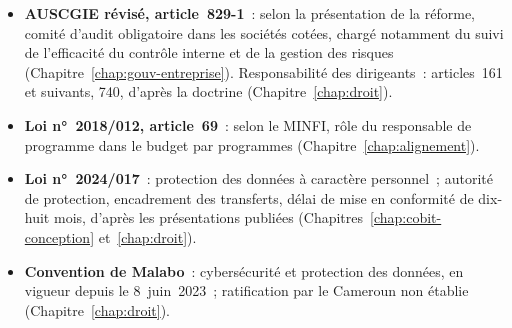 \begin{itemize}
    \item \textbf{AUSCGIE révisé, article~829-1}~: selon la présentation de
          la réforme, comité d'audit obligatoire dans les sociétés cotées,
          chargé notamment du suivi de l'efficacité du contrôle interne et
          de la gestion des risques (Chapitre~\ref{chap:gouv-entreprise}).
          Responsabilité des dirigeants~: articles~161 et suivants, 740,
          d'après la doctrine (Chapitre~\ref{chap:droit}).
    \item \textbf{Loi n°~2018/012, article~69}~: selon le MINFI, rôle du
          responsable de programme dans le budget par programmes
          (Chapitre~\ref{chap:alignement}).
    \item \textbf{Loi n°~2024/017}~: protection des données à caractère
          personnel~; autorité de protection, encadrement des transferts,
          délai de mise en conformité de dix-huit mois, d'après les
          présentations publiées (Chapitres~\ref{chap:cobit-conception}
          et~\ref{chap:droit}).
    \item \textbf{Convention de Malabo}~: cybersécurité et protection des
          données, en vigueur depuis le 8~juin~2023~; ratification par le
          Cameroun non établie (Chapitre~\ref{chap:droit}).
\end{itemize}
